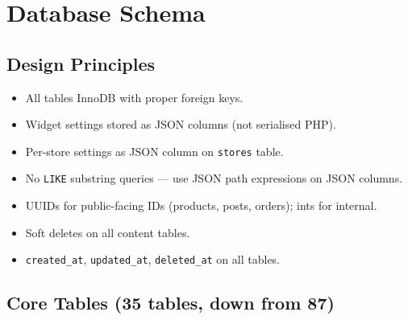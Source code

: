 \documentclass[11pt,a4paper]{article}
\begin{document}
\section{Database Schema}\label{sec:schema}

\subsection{Design Principles}

\begin{itemize}[leftmargin=1.6em,itemsep=2pt]
  \item All tables InnoDB with proper foreign keys.
  \item Widget settings stored as JSON columns (not serialised PHP).
  \item Per-store settings as JSON column on \texttt{stores} table.
  \item No \texttt{LIKE} substring queries --- use JSON path
        expressions on JSON columns.
  \item UUIDs for public-facing IDs (products, posts, orders); ints
        for internal.
  \item Soft deletes on all content tables.
  \item \texttt{created\_at}, \texttt{updated\_at},
        \texttt{deleted\_at} on all tables.
\end{itemize}

\subsection{Core Tables (35 tables, down from 87)}
\end{document}
